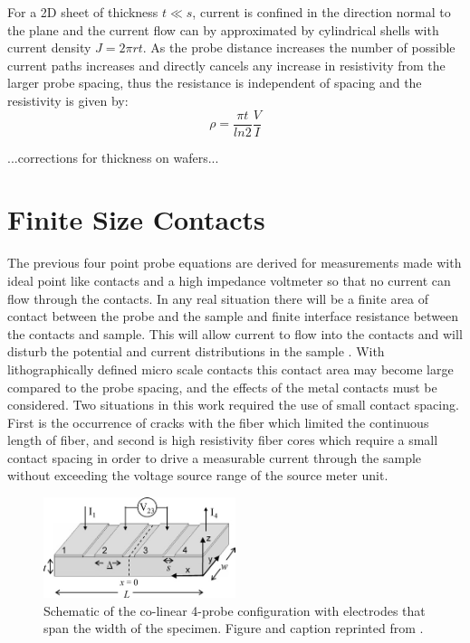     For a 2D sheet of thickness $t \ll s$, current is confined in the direction normal to the plane and the current flow can by approximated by cylindrical shells with current density $J=2 \pi rt$. As the probe distance increases the number of possible current paths increases and directly cancels any increase in resistivity from the larger probe spacing, thus the resistance is independent of spacing and the resistivity is given by: 
    \begin{equation}
        \rho = \frac{\pi t}{ln2}\frac{V}{I}
    \end{equation}
  
  ...corrections for thickness on wafers...
  
\section{Finite Size Contacts}
 The previous four point probe equations are derived for measurements made with ideal point like contacts and a high impedance voltmeter so that no current can flow through the contacts. In any real situation there will be a finite area of contact between the probe and the sample and finite interface resistance between the contacts and sample. This will allow current to flow into the contacts and will disturb the potential and current distributions in the sample \cite{Zimney2007CorrectionStudy}. With lithographically defined micro scale contacts this contact area may become large compared to the probe spacing, and the effects of the metal contacts must be considered. %
 Two situations in this work required the use of small contact spacing. First is the occurrence of cracks with the fiber which limited the continuous length of fiber, and second is high resistivity fiber cores which require a small contact spacing in order to drive a measurable current through the sample without exceeding the voltage source range of the source meter unit. 
 
  
\begin{figure}[h]
  \centering
    \includegraphics[width=0.5\textwidth]{fig/4pp/finite_size_contacts.png}
 \caption{Schematic of the co-linear 4-probe configuration with electrodes that span the width of the specimen. Figure and caption reprinted from \cite{Zimney2007CorrectionStudy}.}
\label{fig1}
\end{figure}

